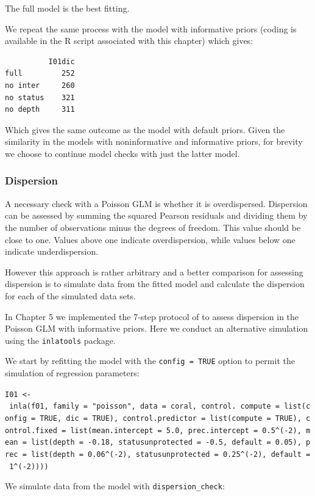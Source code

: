 \documentclass[
]{book}
\begin{document}
The full model is the best fitting.

We repeat the same process with the model with informative priors (coding is available in the R script associated with this chapter) which gives:

\begin{verbatim}
          I01dic
full         252
no inter     260
no status    321
no depth     311
\end{verbatim}

Which gives the same outcome as the model with default priors. Given the similarity in the models with noninformative and informative priors, for brevity we choose to continue model checks with just the latter model.

\hypertarget{nb-disp}{%
\subsubsection{Dispersion}\label{nb-disp}}

A necessary check with a Poisson GLM is whether it is overdispersed. Dispersion can be assessed by summing the squared Pearson residuals and dividing them by the number of observations minus the degrees of freedom. This value should be close to one. Values above one indicate overdispersion, while values below one indicate underdispersion.

However this approach is rather arbitrary and a better comparison for assessing dispersion is to simulate data from the fitted model and calculate the dispersion for each of the simulated data sets.

In Chapter 5 we implemented the 7-step protocol of \citet{Zuur_2017} to assess dispersion in the Poisson GLM with informative priors. Here we conduct an alternative simulation using the \texttt{inlatools} package.

We start by refitting the model with the \texttt{config\ =\ TRUE} option to permit the simulation of regression parameters:

\texttt{I01\ \textless{}-\ inla(f01,\ family\ =\ "poisson",\ data\ =\ coral,\ control.\ compute\ =\ list(config\ =\ TRUE,\ dic\ =\ TRUE),\ control.predictor\ =\ list(compute\ =\ TRUE),\ control.fixed\ =\ list(mean.intercept\ =\ 5.0,\ prec.intercept\ =\ 0.5\^{}(-2),\ mean\ =\ list(depth\ =\ -0.18,\ statusunprotected\ =\ -0.5,\ default\ =\ 0.05),\ prec\ =\ list(depth\ =\ 0.06\^{}(-2),\ statusunprotected\ =\ 0.25\^{}(-2),\ default\ =\ 1\^{}(-2))))}

We simulate data from the model with \texttt{dispersion\_check}:
\end{document}
